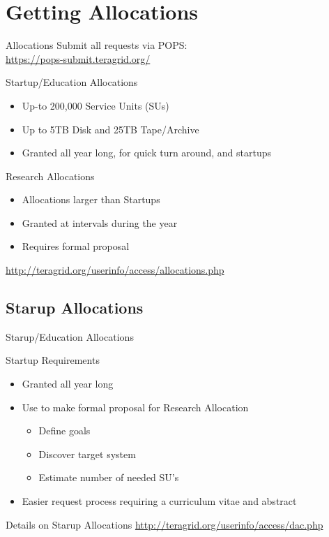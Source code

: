\documentclass[handout]{beamer}
\begin{document}
  \section{Getting Allocations}
  \begin{frame}{Allocations}
    Submit all requests via POPS: \\
    \url{https://pops-submit.teragrid.org/}
   \begin{block}{Startup/Education Allocations}
    \begin{itemize}
     \item Up-to 200,000 Service Units (SUs)
     \item Up to 5TB Disk and 25TB Tape/Archive
     \item Granted all year long, for quick turn around, and startups
    \end{itemize}
   \end{block}
   \begin{block}{Research Allocations}
    \begin{itemize}
     \item Allocations larger than Startups
     \item Granted at intervals during the year
     \item Requires formal proposal
    \end{itemize}
     \url{http://teragrid.org/userinfo/access/allocations.php}
   \end{block}
  \end{frame}

  \subsection{Starup Allocations}

  \begin{frame}{Starup/Education Allocations}
   \begin{block}{Startup Requirements}
    \begin{itemize}
     \item Granted all year long
     \item Use to make formal proposal for Research Allocation
      \begin{itemize}
       \item Define goals 
       \item Discover target system
       \item Estimate number of needed SU's
      \end{itemize}
     \item Easier request process requiring a curriculum vitae and abstract 
    \end{itemize}
   \end{block}
   \begin{block}{Details on Starup Allocations}
    \url{http://teragrid.org/userinfo/access/dac.php}
   \end{block}
  \end{frame}
\end{document}
